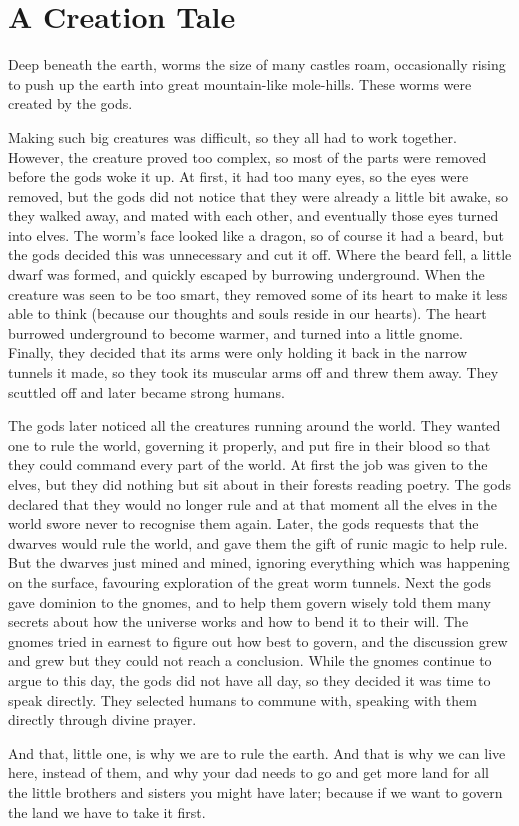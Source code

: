 \chapter{A Creation Tale}

\begin{multicols}{2}

Deep beneath the earth, worms the size of many castles roam, occasionally rising to push up the earth into great mountain-like mole-hills.
These worms were created by the gods.

Making such big creatures was difficult, so they all had to work together.
However, the creature proved too complex, so most of the parts were removed before the gods woke it up.
At first, it had too many eyes, so the eyes were removed, but the gods did not notice that they were already a little bit awake, so they walked away, and mated with each other, and eventually those eyes turned into elves.
The worm's face looked like a dragon, so of course it had a beard, but the gods decided this was unnecessary and cut it off.
Where the beard fell, a little dwarf was formed, and quickly escaped by burrowing underground.
When the creature was seen to be too smart, they removed some of its heart to make it less able to think (because our thoughts and souls reside in our hearts).
The heart burrowed underground to become warmer, and turned into a little gnome.
Finally, they decided that its arms were only holding it back in the narrow tunnels it made, so they took its muscular arms off and threw them away.
They scuttled off and later became strong humans.

The gods later noticed all the creatures running around the world.
They wanted one to rule the world, governing it properly, and put fire in their blood so that they could command every part of the world.
At first the job was given to the elves, but they did nothing but sit about in their forests reading poetry.
The gods declared that they would no longer rule and at that moment all the elves in the world swore never to recognise them again.
Later, the gods requests that the dwarves would rule the world, and gave them the gift of runic magic to help rule.
But the dwarves just mined and mined, ignoring everything which was happening on the surface, favouring exploration of the great worm tunnels.
Next the gods gave dominion to the gnomes, and to help them govern wisely told them many secrets about how the universe works and how to bend it to their will.
The gnomes tried in earnest to figure out how best to govern, and the discussion grew and grew but they could not reach a conclusion.
While the gnomes continue to argue to this day, the gods did not have all day, so they decided it was time to speak directly.
They selected humans to commune with, speaking with them directly through divine prayer.

And that, little one, is why we are to rule the earth.
And that is why we can live here, instead of them, and why your dad needs to go and get more land for all the little brothers and sisters you might have later; because if we want to govern the land we have to take it first.

\end{multicols}

